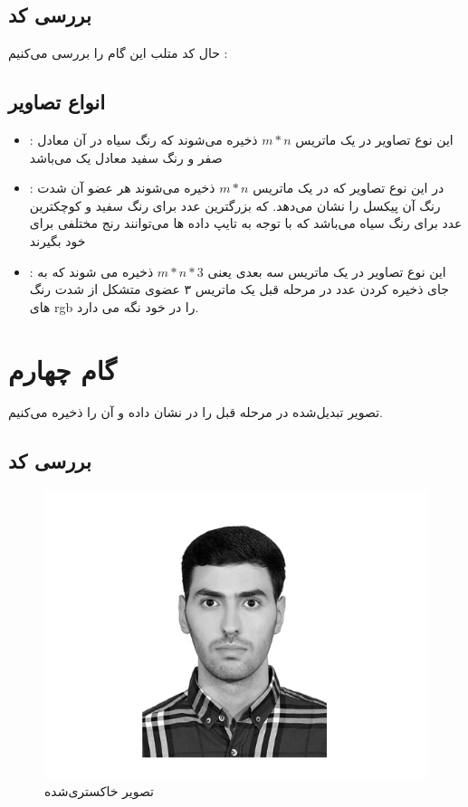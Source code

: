 \subsection{بررسی کد}
حال کد متلب این گام را بررسی می‌کنیم
:
\lr{}

\subsection{انواع تصاویر}
\begin{itemize}
    \item 
    : 
    این نوع تصاویر در یک ماتریس 
    \(m * n\)
    ذخیره می‌شوند که رنگ سیاه در آن معادل صفر و رنگ سفید معادل یک می‌باشد
    
    \item
     : 
    در
    این نوع تصاویر
    که در یک ماتریس
        \(m * n\)
ذخیره می‌شوند
    هر عضو آن شدت رنگ آن پیکسل را نشان می‌دهد.
   که بزرگترین عدد برای رنگ سفید و کوچکترین عدد برای رنگ سیاه می‌باشد 
   که با توجه به تایپ داده ها می‌توانند رنج مختلفی برای خود بگیرند 
   \item {}
   : 
   این نوع تصاویر در یک ماتریس سه بعدی یعنی 
       \(m * n * 3\)
       ذخیره می شوند که به جای ذخیره کردن عدد در مرحله قبل یک ماتریس ۳ عضوی 
       متشکل از شدت رنگ های
       rgb
       را در خود نگه می دارد.

\end{itemize}
\section{گام چهارم}
تصویر تبدیل‌شده در مرحله قبل را در نشان داده و آن را ذخیره می‌کنیم.
\subsection{بررسی کد}
\lr{}
\begin{figure}[H]
    \centering
    \includegraphics[width=0.65\linewidth]{images/gray.png}
    \caption{تصویر خاکستری‌شده  }
    \label{fig:h}
\end{figure}

